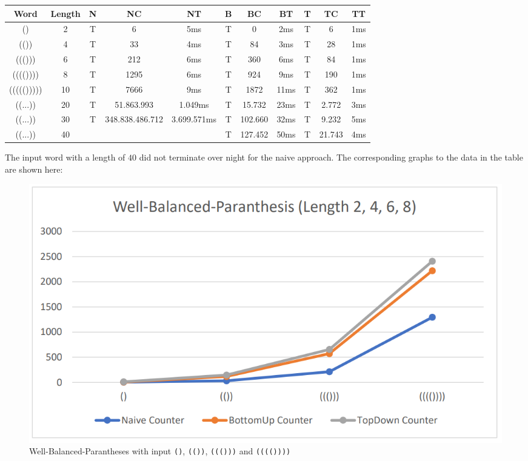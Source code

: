 \documentclass[a4paper, 11pt]{article}
\begin{document}
\begin{small}
\begin{tabular}{|c|c||c|c|c||c|c|c||c|c|c|}
\hline
Word & Length & N & NC & NT & B & BC & BT & T & TC & TT \\
\hline
\hline
() & 2 & T & 6 & 5ms & T & 0 & 2ms & T & 6 & 1ms \\
\hline
(()) & 4 & T & 33 & 4ms & T & 84 & 3ms & T & 28 & 1ms \\
\hline
((())) & 6 & T & 212 & 6ms & T & 360 & 6ms & T & 84 & 1ms \\
\hline
(((()))) & 8 & T & 1295 & 6ms & T & 924 & 9ms & T & 190 & 1ms \\
\hline
((((())))) & 10 & T & 7666 & 9ms & T & 1872 & 11ms & T & 362 & 1ms \\
\hline
((...)) & 20 & T & 51.863.993 & 1.049ms & T & 15.732 & 23ms & T & 2.772 & 3ms \\
\hline
((...)) & 30 & T & 348.838.486.712 & 3.699.571ms & T & 102.660 & 32ms & T & 9.232 & 5ms \\
\hline
((...)) & 40 & & & & T & 127.452 & 50ms & T & 21.743 & 4ms \\
\hline
\end{tabular}
\end{small}

The input word with a length of $40$ did not terminate over night for the naive approach. The corresponding graphs to the data in the table are shown here:
\\
\begin{figure}[H]
\begin{center}
\includegraphics[scale=0.4]{diagrams/WBP_1.png}
\end{center}
\caption{Well-Balanced-Parantheses with input \texttt{()}, \texttt{(())}, \texttt{((()))} and \texttt{(((())))}}
\end{figure}
\end{document}
